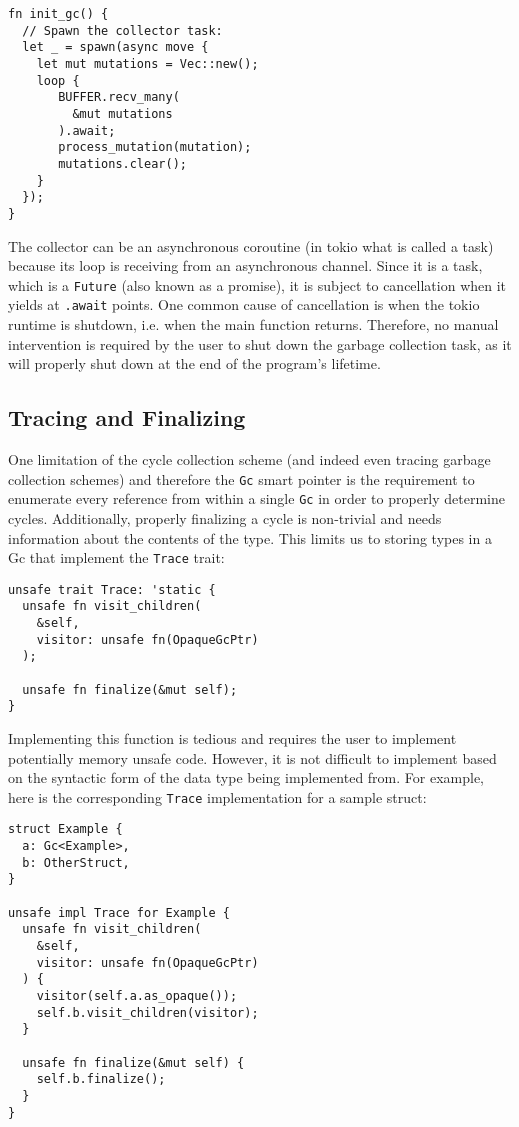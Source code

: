 \documentclass[sigplan,authordraft]{acmart}
\begin{document}
\begin{verbatim}
fn init_gc() {
  // Spawn the collector task:
  let _ = spawn(async move {
    let mut mutations = Vec::new();
    loop {
       BUFFER.recv_many(
         &mut mutations
       ).await;
       process_mutation(mutation);
       mutations.clear();
    } 
  });
}  
\end{verbatim}

The collector can be an asynchronous coroutine (in tokio what is called a task)
because its loop is receiving from an asynchronous channel. Since it is a task,
which is a \texttt{Future} (also known as a promise), it is subject to
cancellation\cite{cancellation} when it yields at \texttt{.await} points.
One common cause of cancellation is when the tokio runtime is shutdown,
i.e. when the main function returns. Therefore, no manual intervention is
required by the user to shut down the garbage collection task, as it will
properly shut down at the end of the program's lifetime.

\subsection{Tracing and Finalizing}

One limitation of the cycle collection scheme (and indeed even tracing garbage
collection schemes) and therefore the \texttt{Gc} smart pointer is the
requirement to enumerate every reference from within a single \texttt{Gc} in
order to properly determine cycles. Additionally, properly finalizing a cycle is
non-trivial and needs information about the contents of the type. This limits us
to storing types in a Gc that implement the \texttt{Trace} trait:

\begin{verbatim}
unsafe trait Trace: 'static {
  unsafe fn visit_children(
    &self,
    visitor: unsafe fn(OpaqueGcPtr)
  );

  unsafe fn finalize(&mut self);
}
\end{verbatim}

Implementing this function is tedious and requires the user to implement
potentially memory unsafe code. However, it is not difficult to implement based
on the syntactic form of the data type being implemented from. For example, here
is the corresponding \texttt{Trace} implementation for a sample struct:

\begin{verbatim}
struct Example {
  a: Gc<Example>,
  b: OtherStruct,
}

unsafe impl Trace for Example {
  unsafe fn visit_children(
    &self,
    visitor: unsafe fn(OpaqueGcPtr)
  ) {
    visitor(self.a.as_opaque());
    self.b.visit_children(visitor);
  }

  unsafe fn finalize(&mut self) {
    self.b.finalize();
  }
}
\end{verbatim}
\end{document}
